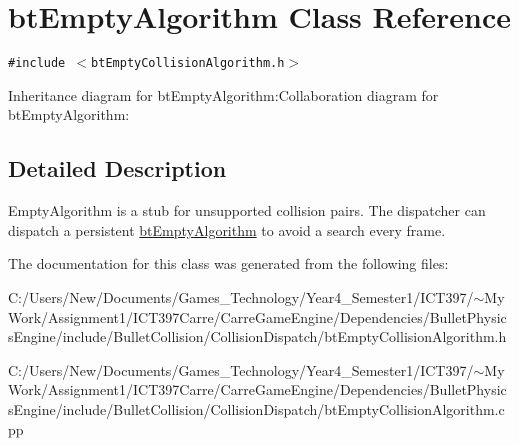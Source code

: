 \hypertarget{classbt_empty_algorithm}{
\section{btEmptyAlgorithm Class Reference}
\label{classbt_empty_algorithm}
}
{\tt \#include $<$btEmptyCollisionAlgorithm.h$>$}

Inheritance diagram for btEmptyAlgorithm:Collaboration diagram for btEmptyAlgorithm:

\subsection{Detailed Description}
EmptyAlgorithm is a stub for unsupported collision pairs. The dispatcher can dispatch a persistent \hyperlink{classbt_empty_algorithm}{btEmptyAlgorithm} to avoid a search every frame. 

The documentation for this class was generated from the following files:\begin{CompactItemize}
\item 
C:/Users/New/Documents/Games\_\-Technology/Year4\_\-Semester1/ICT397/$\sim$My Work/Assignment1/ICT397Carre/CarreGameEngine/Dependencies/BulletPhysicsEngine/include/BulletCollision/CollisionDispatch/btEmptyCollisionAlgorithm.h\item 
C:/Users/New/Documents/Games\_\-Technology/Year4\_\-Semester1/ICT397/$\sim$My Work/Assignment1/ICT397Carre/CarreGameEngine/Dependencies/BulletPhysicsEngine/include/BulletCollision/CollisionDispatch/btEmptyCollisionAlgorithm.cpp\end{CompactItemize}
